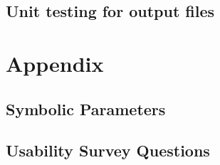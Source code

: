 \documentclass{article}
\begin{document}
\subsection{Unit testing for output files}

\section{Appendix}
\subsection{Symbolic Parameters}
\subsection{Usability Survey Questions}
\end{document}
